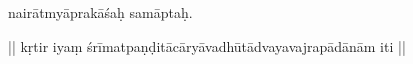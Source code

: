 \documentclass[naipra.tex]{subfiles}
\begin{document}
\begin{sanskrit}

\medskip\pstart
nairātmyāprakāśaḥ samāptaḥ. 
\pend

\bigskip\pstart
\begin{center}
|| kṛtir iyaṃ śrīmatpaṇḍitācāryāvadhūtādvayavajrapādānām iti ||
\end{center}
\pend



\end{sanskrit}
\endnumbering
\end{document}
